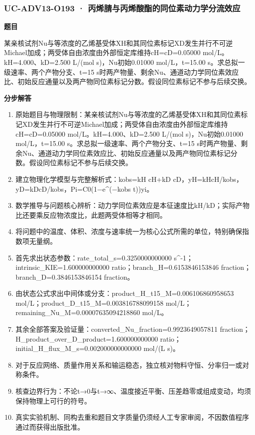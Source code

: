 \documentclass[UTF8,11pt,a4paper]{ctexart}
\begin{document}
\subsubsection*{UC-ADV13-O193 · 丙烯腈与丙烯酸酯的同位素动力学分流效应}
\noindent\textbf{题目}\par
某亲核试剂Nu与等浓度的乙烯基受体XH和其同位素标记XD发生并行不可逆Michael加成；两受体自由浓度由外部恒定库维持cH=cD=0.05000 mol/L。kH=4.000、kD=2.500 L/(mol s)，Nu初始0.01000 mol/L，t=15.00 s。求总拟一级速率、两个产物分支、t=15 s时两产物量、剩余Nu、通道动力学同位素效应比、初始反应通量以及两产物同位素标记分数。假设同位素标记不参与后续交换。\par
\medskip\noindent\textbf{分步解答}
\begin{enumerate}
\item 原始题目与物理限制：某亲核试剂Nu与等浓度的乙烯基受体XH和其同位素标记XD发生并行不可逆Michael加成；两受体自由浓度由外部恒定库维持cH=cD=0.05000 mol/L。kH=4.000、kD=2.500 L/(mol s)，Nu初始0.01000 mol/L，t=15.00 s。求总拟一级速率、两个产物分支、t=15 s时两产物量、剩余Nu、通道动力学同位素效应比、初始反应通量以及两产物同位素标记分数。假设同位素标记不参与后续交换。
\item 建立物理化学模型与完整解析式：kobs=kH cH+kD cD，yH=kHcH/kobs，yD=kDcD/kobs，Pi=C0(1−e\textasciicircum{}(−kobs t))yi。
\item 数学推导与问题核心辨析：动力学同位素效应是本征速度比kH/kD；实际产物比还要乘反应物浓度比，此题两受体相等才相同。
\item 将问题中的温度、体积、浓度与速率统一为核心公式所需的单位，特别确保指数项无量纲。
\item 首先求出状态参数：rate\_total\_s=0.3250000000000 s\textasciicircum{}-1；intrinsic\_KIE=1.600000000000 ratio；branch\_H=0.6153846153846 fraction；branch\_D=0.3846153846154 fraction。
\item 由状态公式求出中间体或分支：product\_H\_t15\_M=0.006106860958653 mol/L；product\_D\_t15\_M=0.003816788099158 mol/L；remaining\_Nu\_M=0.00007635094218860 mol/L。
\item 其余全部答案及验证量：converted\_Nu\_fraction=0.9923649057811 fraction；H\_product\_over\_D\_product=1.600000000000 ratio；initial\_H\_flux\_M\_s=0.002000000000000 mol/(L s)。
\item 对于反应网络、质量作用关系和输运稳态，独立核对物料守恒、分率归一或对称条件。
\item 核查边界行为：不论t→0与t→∞、温度接近平衡、压差趋零或组成变动，均须保持物理上可行的符号。
\item 真实实验机制、同构去重和题目文字质量仍须经人工专家审阅，不因数值程序通过而获得出版批准。
\end{enumerate}
\end{document}
